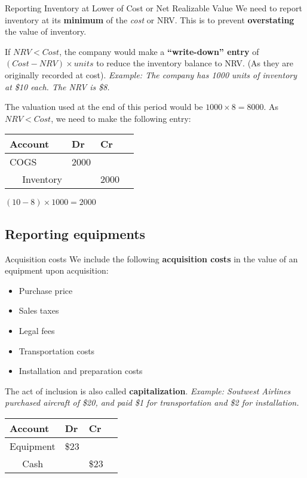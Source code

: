 \begin{theorem}
    {Reporting Inventory at Lower of Cost or Net Realizable Value}
    We need to report inventory at its \textbf{minimum} of the \textit{cost} or NRV. This is to prevent \textbf{overstating} the value of inventory.

    If $NRV < Cost$, the company would make a \textbf{“write-down” entry} of $(Cost - NRV) \times units$ to reduce the inventory balance to NRV. (As they are originally recorded at cost).
    \tcblower
    \textit{Example: The company has 1000 units of inventory at \$10 each. The NRV is \$8.}

    The valuation used at the end of this period would be $1000 \times 8 = 8000$. As $NRV < Cost$, we need to make the following entry:

    \begin{tabular}{llll}
        \textbf{Account}  & \textbf{Dr} & \textbf{Cr} \\
        \hline
        COGS              & 2000        &             \\
        $\quad$ Inventory &             & 2000        \\
    \end{tabular}

    $(10-8)\times1000=2000$
\end{theorem}

\subsection{Reporting equipments}

\begin{definition}
    {Acquisition costs}
    We include the following \textbf{acquisition costs} in the value of an equipment upon acquisition:
    \begin{itemize}
        \item Purchase price
        \item Sales taxes
        \item Legal fees
        \item Transportation costs
        \item Installation and preparation costs
    \end{itemize}
    The act of inclusion is also called \textbf{capitalization}.
    \tcblower
    \textit{Example: Soutwest Airlines purchased aircraft of \$20, and paid \$1 for transportation and \$2 for installation.}

    \begin{tabular}{llll}
        \textbf{Account} & \textbf{Dr} & \textbf{Cr} \\
        \hline
        Equipment        & \$23        &             \\
        $\quad$ Cash     &             & \$23        \\
    \end{tabular}
\end{definition}

